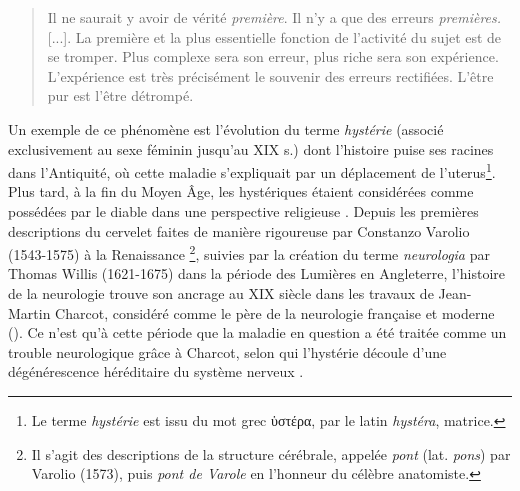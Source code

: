 %

\begin{quote} 

\og{}Il ne saurait y avoir de vérité \textit{première}. Il n'y a que des erreurs \textit{premières.}  [...]. La première et la plus essentielle fonction de l'activité du sujet est de se tromper. Plus complexe sera son erreur, plus riche sera son expérience. L'expérience est très précisément le souvenir des erreurs rectifiées. L'être pur est l'être détrompé. \fg{} 

\end{quote}

Un exemple de ce phénomène est l'évolution du terme \textit{hystérie} (associé exclusivement au sexe féminin jusqu'au XIX\ieme{} s.) dont l'histoire puise ses racines dans l'Antiquité, où cette maladie s'expliquait par un déplacement de l'uterus\footnote{Le terme \textit{hystérie} est issu du mot grec ὑστέρα, par le latin \textit{hystéra}, \og{}matrice\fg{}.}. Plus tard, à la fin du Moyen Âge, les hystériques étaient considérées comme possédées par le diable dans une perspective religieuse \citep{roudinesco}. Depuis les premières descriptions du cervelet faites de manière rigoureuse par Constanzo Varolio (1543-1575) à la Renaissance \citep{kneib2011etude}\footnote{Il s'agit des descriptions de la structure cérébrale, appelée \textit{pont} (lat. \textit{pons}) par Varolio (1573), puis \textit{pont de Varole} en l'honneur du célèbre anatomiste.}, suivies par la création du terme \textit{neurologia} par Thomas Willis (1621-1675) dans la période des Lumières en Angleterre, l'histoire de la neurologie trouve son ancrage au XIX\ieme{} siècle dans les travaux de Jean-Martin Charcot, considéré comme le père de la neurologie française et moderne (\citealp{teive2022thomas,BROUSSOLLE2012301}). Ce n'est qu'à cette période que la maladie en question a été traitée comme un trouble neurologique grâce à Charcot, selon qui l'hystérie découle d'une dégénérescence héréditaire du système nerveux \citep{tasca2012women}. 

